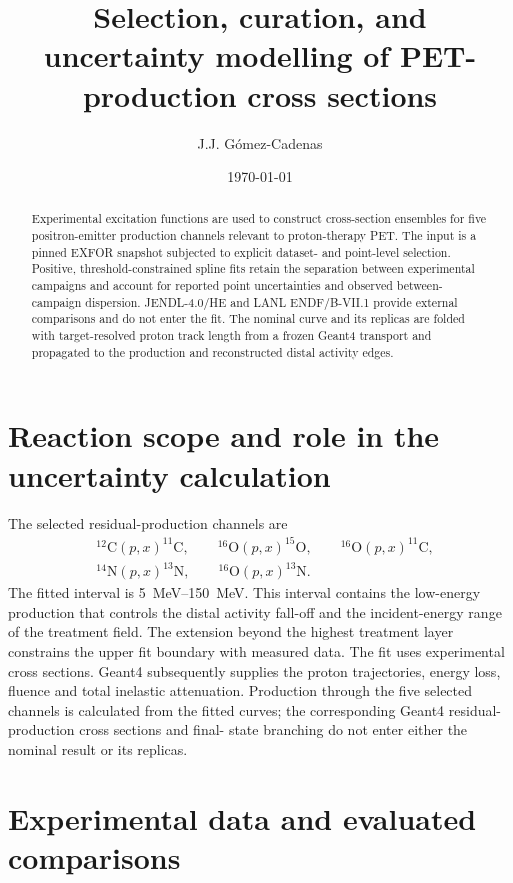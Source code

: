 \documentclass[11pt]{article}
\title{Selection, curation, and uncertainty modelling of PET-production
cross sections}
\author{J.J. G\'omez-Cadenas}
\date{\today}
\begin{document}
\maketitle

\begin{abstract}
Experimental excitation functions are used to construct cross-section
ensembles for five positron-emitter production channels relevant to
proton-therapy PET.  The input is a pinned EXFOR snapshot subjected to explicit
dataset- and point-level selection.  Positive, threshold-constrained spline
fits retain the separation between experimental campaigns and account for
reported point uncertainties and observed between-campaign dispersion.
JENDL-4.0/HE and LANL ENDF/B-VII.1 provide external comparisons and do not
enter the fit.  The nominal curve and its replicas are folded with
target-resolved proton track length from a frozen Geant4 transport and
propagated to the production and reconstructed distal activity edges.
\end{abstract}

\section{Reaction scope and role in the uncertainty calculation}

The selected residual-production channels are
\begin{equation}
\begin{split}
  &^{12}\mathrm{C}(p,x)^{11}\mathrm{C},\qquad
   ^{16}\mathrm{O}(p,x)^{15}\mathrm{O},\qquad
   ^{16}\mathrm{O}(p,x)^{11}\mathrm{C},\\
  &^{14}\mathrm{N}(p,x)^{13}\mathrm{N},\qquad
   ^{16}\mathrm{O}(p,x)^{13}\mathrm{N}.
\end{split}
\end{equation}
The fitted interval is \SIrange{5}{150}{MeV}.  This interval contains the
low-energy production that controls the distal activity fall-off and the
incident-energy range of the treatment field.  The extension beyond the
highest treatment layer constrains the upper fit boundary with measured data.
The fit uses experimental cross sections.  Geant4 subsequently supplies the
proton trajectories, energy loss, fluence and total inelastic attenuation.
Production through the five selected channels is calculated from the fitted
curves; the corresponding Geant4 residual-production cross sections and final-
state branching do not enter either the nominal result or its replicas.

\section{Experimental data and evaluated comparisons}
\end{document}
